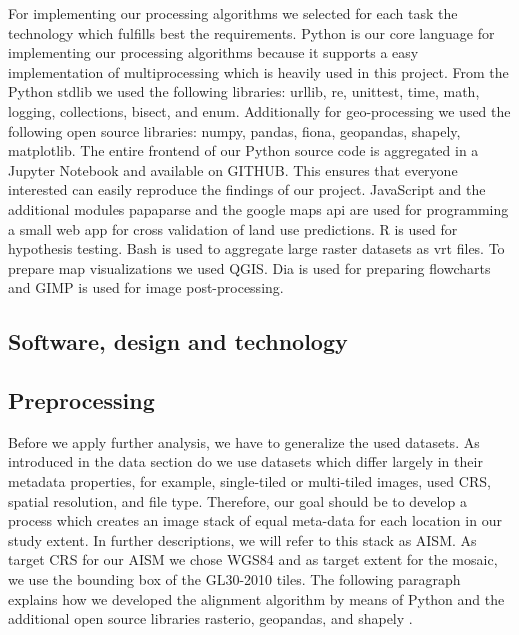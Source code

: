 	For implementing our processing algorithms we selected for each task the technology which fulfills best the requirements. Python is our core language for implementing our processing algorithms because it supports a easy implementation of multiprocessing which is heavily used in this project. From the Python \ac{stdlib} we used the following libraries: urllib, re, unittest, time, math, logging, collections, bisect, and enum. Additionally for geo-processing we used the following open source libraries: numpy, pandas, fiona, geopandas, shapely, matplotlib. The entire frontend of our Python source code is aggregated in a Jupyter Notebook and available on GITHUB. This ensures that everyone interested can easily reproduce the findings of our project. JavaScript and the additional modules papaparse and the google maps api are used for programming a small web app for cross validation of land use predictions. R is used for hypothesis testing. Bash is used to aggregate large raster datasets as vrt files. To prepare map visualizations we used QGIS. Dia is used for preparing flowcharts and GIMP is used for image post-processing.

	\subsection{Software, design and technology}

	\subsection{Preprocessing}
		Before we apply further analysis, we have to generalize the used datasets. As introduced in the data section do we use datasets which differ largely in their metadata properties, for example, single-tiled or multi-tiled images, used \ac{CRS}, spatial resolution, and file type. Therefore, our goal should be to develop a process which creates an image stack of equal meta-data for each location in our study extent. In further descriptions, we will refer to this stack as \ac{AISM}. As target \ac{CRS} for our \ac{AISM} we chose \ac{WGS84} and as target extent for the mosaic, we use the bounding box of the \ac{GL30}-2010 tiles. The following paragraph explains how we developed the alignment algorithm by means of Python and the additional open source libraries rasterio, geopandas, and shapely \citep{Rossum2018,McKinney2010}.

